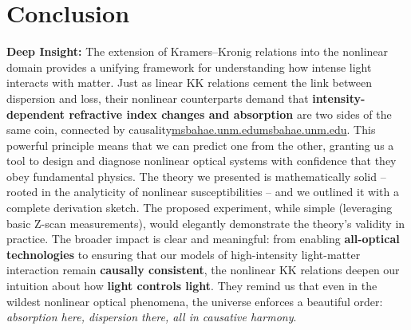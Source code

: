 \documentclass[11pt,a4paper]{article}
\begin{document}
\section{Conclusion}

\textbf{Deep Insight:} The extension of Kramers–Kronig relations into the nonlinear domain provides a unifying framework for understanding how intense light interacts with matter. Just as linear KK relations cement the link between dispersion and loss, their nonlinear counterparts demand that \textbf{intensity-dependent refractive index changes and absorption} are two sides of the same coin, connected by causality\href{https://msbahae.unm.edu/Courses/568%20Nonlinear%20Optics/OSA-Handbook%20of%20Optics-IV-Ch17.pdf#:~:text=recently%2C however ,It is}{msbahae.unm.edu}\href{https://msbahae.unm.edu/Courses/568%20Nonlinear%20Optics/OSA-Handbook%20of%20Optics-IV-Ch17.pdf#:~:text=ω ω ζ d cn,− ∆ ∆ %3D 0}{msbahae.unm.edu}. This powerful principle means that we can predict one from the other, granting us a tool to design and diagnose nonlinear optical systems with confidence that they obey fundamental physics. The theory we presented is mathematically solid – rooted in the analyticity of nonlinear susceptibilities – and we outlined it with a complete derivation sketch. The proposed experiment, while simple (leveraging basic Z-scan measurements), would elegantly demonstrate the theory’s validity in practice. The broader impact is clear and meaningful: from enabling \textbf{all-optical technologies} to ensuring that our models of high-intensity light-matter interaction remain \textbf{causally consistent}, the nonlinear KK relations deepen our intuition about how \textbf{light controls light}. They remind us that even in the wildest nonlinear optical phenomena, the universe enforces a beautiful order: \emph{absorption here, dispersion there, all in causative harmony}.
\end{document}
